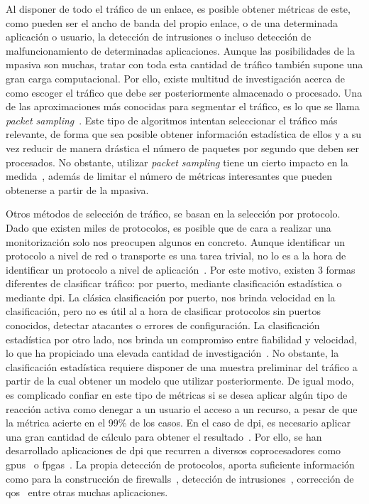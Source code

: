 Al disponer de todo el tráfico de un enlace, es posible obtener métricas de este, como pueden ser el ancho de banda del propio enlace, o de una determinada aplicación o usuario, la detección de intrusiones o incluso detección de malfuncionamiento de determinadas aplicaciones.
Aunque las posibilidades de la \gls{mpasiva} son muchas, tratar con toda esta cantidad de tráfico también supone una gran carga computacional. Por ello, existe multitud de investigación acerca de como escoger el tráfico que debe ser posteriormente almacenado o procesado.
Una de las aproximaciones más conocidas para segmentar el tráfico, es lo que se llama \textit{packet sampling}~\cite{1209210}. Este tipo de algoritmos intentan seleccionar el tráfico más relevante, de forma que sea posible obtener información estadística de ellos y a su vez reducir de manera drástica el número de paquetes por segundo que deben ser procesados. No obstante, utilizar \textit{packet sampling} tiene un cierto impacto en la medida~\cite{Brauckhoff:2006:IPS:1177080.1177101}, además de limitar el número de métricas interesantes que pueden obtenerse a partir de la \gls{mpasiva}.

Otros métodos de selección de tráfico, se basan en la selección por protocolo. Dado que existen miles de protocolos, es posible que de cara a realizar una monitorización solo nos preocupen algunos en concreto. Aunque identificar un protocolo a nivel de red o transporte es una tarea trivial, no lo es a la hora de identificar un protocolo a nivel de aplicación~\cite{dpdk:Leir1306}. Por este motivo, existen 3 formas diferentes de clasificar tráfico: por puerto, mediante clasificación estadística o mediante \gls{dpi}.
La clásica clasificación por puerto, nos brinda velocidad en la clasificación, pero no es útil al a hora de clasificar protocolos sin puertos conocidos, detectar atacantes o errores de configuración. La clasificación estadística por otro lado, nos brinda un compromiso entre fiabilidad y velocidad, lo que ha propiciado una elevada cantidad de investigación~\cite{dpi:critica:3,dpi:critica:7,dpi:critica:8,dpi:critica:13}. No obstante, la clasificación estadística requiere disponer de una muestra preliminar del tráfico a partir de la cual obtener un modelo que utilizar posteriormente. De igual modo, es complicado confiar en este tipo de métricas si se desea aplicar algún tipo de reacción activa como denegar a un usuario el acceso a un recurso, a pesar de que la métrica acierte en el 99\% de los casos.
En el caso de \gls{dpi}, es necesario aplicar una gran cantidad de cálculo para obtener el resultado~\cite{dpi:critica:10b}. Por ello, se han desarrollado aplicaciones de \gls{dpi} que recurren a diversos coprocesadores como \glspl{gpu}~\cite{dpi:gnort,dpdk:Leir1306} o \glspl{fpga}~\cite{dpi:tfm:6,dpi:tfm:7,dpi:tfm:8,dpi:tfm:11}.
La propia detección de protocolos, aporta suficiente información como para la construcción de firewalls~\cite{dpi:juancho:master,dpi:pedro:2}, detección de intrusiones~\cite{dpi:gnort}, corrección de \gls{qos}~\cite{dpdk:Leir1306} entre otras muchas aplicaciones.

